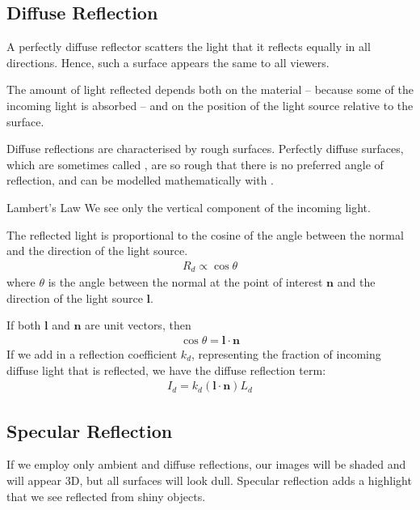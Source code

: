 \documentclass[../COS3712_Notes.tex]{subfiles}
\begin{document}
      \subsection{Diffuse Reflection}
        A perfectly diffuse reflector scatters the light that it reflects equally in all directions.
        Hence, such a surface appears the same to all viewers.

        The amount of light reflected depends both on the material
        -- because some of the incoming light is absorbed --
        and on the position of the light source relative to the surface.

        Diffuse reflections are characterised by rough surfaces.
        Perfectly diffuse surfaces, which are sometimes called ,
        are so rough that there is no preferred angle of reflection,
        and can be modelled mathematically with .

        \begin{definition}{Lambert's Law}
          We see only the vertical component of the incoming light.

          The reflected light is proportional to the cosine of the angle between the normal
          and the direction of the light source.
          \begin{align*}
            R_d \propto \cos\theta
          \end{align*}
          where $\theta$ is the angle between the normal at the point of interest $\mathbf{n}$
          and the direction of the light source $\mathbf{l}$.

          If both $\mathbf{l}$ and $\mathbf{n}$ are unit vectors,
          then
          \begin{align*}
            \cos\theta = \mathbf{l} \cdot \mathbf{n}
          \end{align*}
          If we add in a reflection coefficient $k_d$, representing the fraction of incoming
          diffuse light that is reflected,
          we have the diffuse reflection term:
          \begin{align*}
            I_d = k_d (\mathbf{l} \cdot \mathbf{n}) L_d
          \end{align*}
        \end{definition}

      \subsection{Specular Reflection}
        If we employ only ambient and diffuse reflections, our images will be shaded and will
        appear 3D, but all surfaces will look dull.
        Specular reflection adds a highlight that we see reflected from shiny objects.
\end{document}
